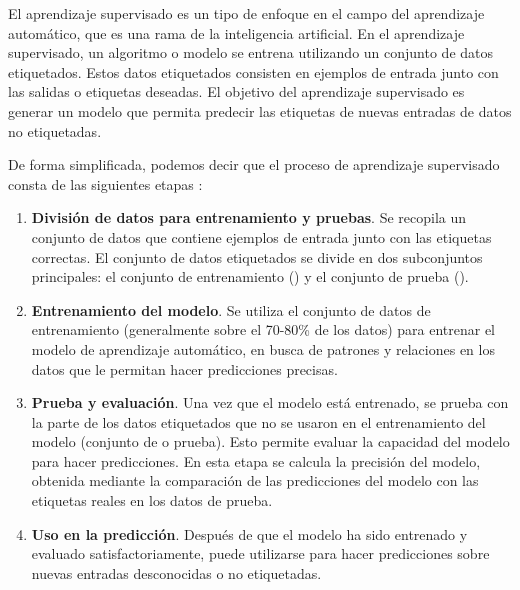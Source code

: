 El aprendizaje supervisado es un tipo de enfoque en el campo del aprendizaje automático, que es una rama de la inteligencia artificial. 
En el aprendizaje supervisado, un algoritmo o modelo se entrena utilizando un conjunto de datos etiquetados. 
Estos datos etiquetados consisten en ejemplos de entrada junto con las salidas o etiquetas deseadas. 
El objetivo del aprendizaje supervisado es generar un modelo que permita 
predecir las etiquetas de nuevas entradas de datos no etiquetadas.
\

De forma simplificada, podemos decir que el proceso de aprendizaje supervisado consta de las siguientes etapas \cite{aprendizaje}: 

\begin{enumerate}
	\item \textbf{División de datos para entrenamiento y pruebas}. Se recopila un conjunto de datos que contiene ejemplos de entrada 
	junto con las etiquetas correctas. El conjunto de datos etiquetados se divide en dos subconjuntos principales: 
	el conjunto de entrenamiento () y el conjunto de prueba (). 
    \item \textbf{Entrenamiento del modelo}. Se utiliza el conjunto de datos de entrenamiento (generalmente sobre
	 el 70-80\% de los datos) para entrenar el modelo de aprendizaje automático, en busca de patrones y relaciones en los datos
	  que le permitan hacer predicciones precisas.
	\item \textbf{Prueba y evaluación}. Una vez que el modelo está entrenado, se prueba con la parte de los datos etiquetados 
	que no se usaron en el entrenamiento del modelo (conjunto de  o prueba). Esto permite evaluar la capacidad del 
	modelo para hacer predicciones. En esta etapa se calcula la precisión del modelo, obtenida mediante la comparación de
	 las predicciones del modelo con las etiquetas reales en los datos de prueba.
	\item \textbf{Uso en la predicción}. Después de que el modelo ha sido entrenado y evaluado satisfactoriamente, 
	puede utilizarse para hacer predicciones sobre nuevas entradas desconocidas o no etiquetadas. 
\end{enumerate}

